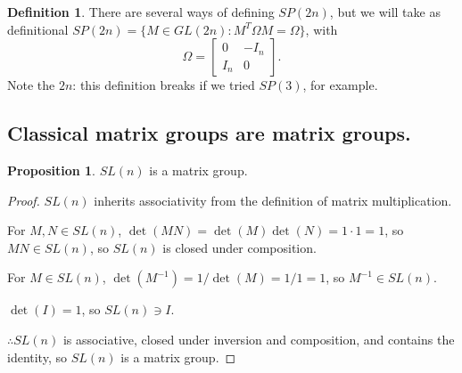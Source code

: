 \documentclass[12pt]{article}
\theoremstyle{definition}
\newtheorem{prop}[them]{Proposition}
\theoremstyle{definition}
\theoremstyle{definition}
\theoremstyle{definition}
\theoremstyle{definition}
\newtheorem{defn}[them]{Definition}
\theoremstyle{definition}
\theoremstyle{definition}
\theoremstyle{definition}
\begin{document}
\begin{defn}
There are several ways of defining $SP(2n)$, but
we will take as definitional $SP(2n) = \{M \in
GL(2n): M^T\Omega M = \Omega\}$, with \[\Omega =
\begin{bmatrix} 0 & -I_n \\
I_n & 0 \end{bmatrix}.\] Note the $2n$: this
definition breaks if we tried $SP(3)$, for example.
\end{defn}

\subsection{Classical matrix groups are matrix groups.}

\begin{prop}$SL(n)$ is a matrix group.\end{prop}
\begin{proof}
\par{$SL(n)$ inherits associativity from the definition of matrix multiplication.}
\par{For $M, N \in SL(n)$, $\det(MN) = \det(M) \det(N) = 1 \cdot 1 = 1$, so $MN \in SL(n)$, so $SL(n)$ is closed under composition.}
\par{For $M \in SL(n)$, $\det(M^{-1}) = 1 /
\det(M) = 1 / 1 = 1$, so $M^{-1} \in SL(n)$.}
\par{$\det(I) = 1$, so $SL(n) \ni I$.}
\par{$\therefore SL(n)$ is associative, closed under inversion and composition, and contains the identity, so $SL(n)$ is a matrix group.}
\end{proof}
    
\end{document}
